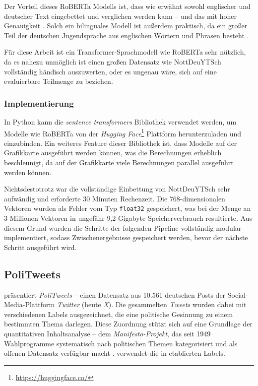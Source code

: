 Der Vorteil dieses RoBERTa Modells ist, dass wie erwähnt sowohl englischer und deutscher Text eingebettet und verglichen werden kann -- und das mit hoher Genauigkeit \autocite{RG19}.
Solch ein bilinguales Modell ist außerdem praktisch, da ein großer Teil der deutschen Jugendsprache aus englischen Wörtern und Phrasen besteht \autocite{Po24}.

Für diese Arbeit ist ein Transformer-Sprachmodell wie RoBERTa sehr nützlich, da es nahezu unmöglich ist einen großen Datensatz wie NottDeuYTSch vollständig händisch auszuwerten, oder es ungenau wäre, sich auf eine evaluierbare Teilmenge zu beziehen.

\subsubsection{Implementierung}
In Python kann die \emph{sentence transformers} Bibliothek \autocite{RG19} verwendet werden, um Modelle wie RoBERTa von der \emph{Hugging Face}\footnote{\url{https://huggingface.co/}} Plattform herunterzuladen und einzubinden.
Ein weiteres Feature dieser Bibliothek ist, dass Modelle auf der Grafikkarte ausgeführt werden können, was die Berechnungen erheblich beschleunigt, da auf der Grafikkarte viele Berechnungen parallel ausgeführt werden können.

Nichtsdestotrotz war die vollständige Einbettung von NottDeuYTSch sehr aufwändig und erforderte 30 Minuten Rechenzeit.
Die 768-dimensionalen Vektoren wurden als Felder vom Typ \lstinline|float32| gespeichert, was bei der Menge an 3 Millionen Vektoren in ungefähr 9,2 Gigabyte Speicherverbrauch resultierte.
Aus diesem Grund wurden die Schritte der folgenden Pipeline vollständig modular implementiert, sodass Zwischenergebnisse gespeichert werden, bevor der nächste Schritt ausgeführt wird.

\subsection{PoliTweets} \label{subsec:2.3}
\textcite{Bie22} präsentiert \emph{PoliTweets} -- einen Datensatz aus 10.561 deutschen Posts der Social-Media-Plattform \emph{Twitter} (heute \emph{X}).
Die gesammelten \emph{Tweets} wurden dabei mit verschiedenen Labels ausgezeichnet, die eine politische Gesinnung zu einem bestimmten Thema darlegen.
Diese Zuordnung stützt sich auf eine Grundlage der quantitativen Inhaltsanalyse -- dem \emph{Manifesto-Projekt}, das seit 1949 Wahlprogramme systematisch nach politischen Themen kategorisiert und als offenen Datensatz verfügbar macht \autocite{Vol23}.
\textcite{Bie22} verwendet die in \textcite{Vol23} etablierten Labels.

